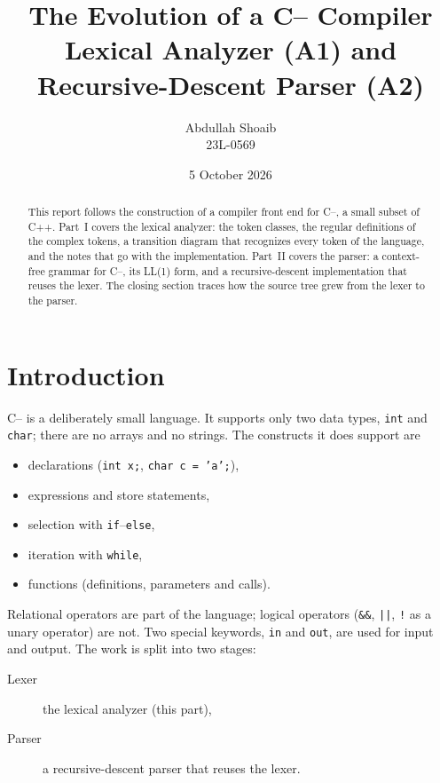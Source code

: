 \documentclass[11pt]{article}
\title{The Evolution of a C-- Compiler\\[0.35em]
       \large Lexical Analyzer (A1) and Recursive-Descent Parser (A2)}
\author{Abdullah Shoaib\\ \small 23L-0569}
\date{5 October 2026}
\begin{document}
\maketitle

\begin{abstract}
This report follows the construction of a compiler front end for
\textsf{C--}, a small subset of C++. Part~I covers the lexical analyzer: the token classes, the regular definitions of the complex
tokens, a transition diagram that recognizes every token of the language,
and the notes that go with the implementation. Part~II covers the parser: a context-free grammar for \textsf{C--}, its LL(1) form, and a
recursive-descent implementation that reuses the lexer. The closing section
traces how the source tree grew from the lexer to the parser.
\end{abstract}

\tableofcontents

\section{Introduction}
\textsf{C--} is a deliberately small language. It supports only two data
types, \texttt{int} and \texttt{char}; there are no arrays and no strings.
The constructs it does support are

\begin{itemize}
  \item declarations (\texttt{int x;}, \texttt{char c = 'a';}),
  \item expressions and store statements,
  \item selection with \texttt{if}--\texttt{else},
  \item iteration with \texttt{while},
  \item functions (definitions, parameters and calls).
\end{itemize}

\noindent
Relational operators are part of the language; logical operators
(\texttt{\&\&}, \texttt{||}, \texttt{!} as a unary operator) are not.
Two special keywords, \texttt{in} and \texttt{out}, are used for input and
output. The work is split into two stages:

\begin{description}
  \item[Lexer] the lexical analyzer (this part),
  \item[Parser] a recursive-descent parser that reuses the lexer.
\end{description}
\end{document}
